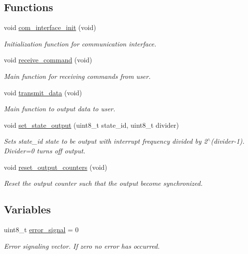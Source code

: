 \subsection*{\-Functions}
\begin{DoxyCompactItemize}
\item 
void \hyperlink{group__user__interface_ga87a9b575684eea3d1a804e597236b40f}{com\-\_\-interface\-\_\-init} (void)
\begin{DoxyCompactList}\small\item\em \-Initialization function for communication interface. \end{DoxyCompactList}\item 
void \hyperlink{group__user__interface_ga328bb6c7a4ed590a8a4eb1b2a60943f1}{receive\-\_\-command} (void)
\begin{DoxyCompactList}\small\item\em \-Main function for receiving commands from user. \end{DoxyCompactList}\item 
void \hyperlink{group__user__interface_ga9926a12daaecdbb4d8106ed110510d49}{transmit\-\_\-data} (void)
\begin{DoxyCompactList}\small\item\em \-Main function to output data to user. \end{DoxyCompactList}\item 
void \hyperlink{group__user__interface_ga56ca2a8f03cbdf960d6928e9a7ad68ba}{set\-\_\-state\-\_\-output} (uint8\-\_\-t state\-\_\-id, uint8\-\_\-t divider)
\begin{DoxyCompactList}\small\item\em \-Sets state\-\_\-id state to be output with interrupt frequency divided by 2$^\wedge$(divider-\/1). \-Divider=0 turns off output. \end{DoxyCompactList}\item 
void \hyperlink{group__user__interface_gad8c48701618a71f6bcc9ec12d139ba32}{reset\-\_\-output\-\_\-counters} (void)
\begin{DoxyCompactList}\small\item\em \-Reset the output counter such that the output become synchronized. \end{DoxyCompactList}\end{DoxyCompactItemize}
\subsection*{\-Variables}
\begin{DoxyCompactItemize}
\item 
uint8\-\_\-t \hyperlink{group__user__interface_ga3f996476795917a4b1ace8c6c5e4b28a}{error\-\_\-signal} = 0
\begin{DoxyCompactList}\small\item\em \-Error signaling vector. \-If zero no error has occurred. \end{DoxyCompactList}\end{DoxyCompactItemize}
